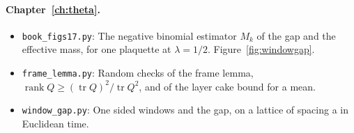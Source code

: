 \paragraph{Chapter~\ref{ch:theta}.}\nopagebreak
\begin{itemize}\setlength{\itemsep}{0pt}\setlength{\parskip}{0pt}
\item \texttt{book\_figs17.py}: The negative binomial estimator $M_k$ of the gap and the effective mass, for one plaquette at $\lambda=1/2$. Figure~\ref{fig:windowgap}.
\item \texttt{frame\_lemma.py}: Random checks of the frame lemma, $\operatorname{rank}Q\ge(\operatorname{tr}Q)^2/\operatorname{tr}Q^2$, and of the layer cake bound for a mean.
\item \texttt{window\_gap.py}: One sided windows and the gap, on a lattice of spacing a in Euclidean time.
\end{itemize}
